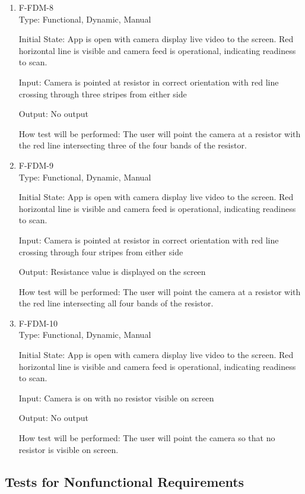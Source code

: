 \documentclass[12pt, titlepage]{article}
\begin{document}
\begin{enumerate}
\item{F-FDM-8\\}
Type: Functional, Dynamic, Manual
					
Initial State: 
App is open with camera display live video to the screen. Red horizontal line is visible and camera feed is operational, indicating readiness to scan.
					
Input: 
Camera is pointed at resistor in correct orientation with red line crossing through three stripes from either side
					
Output: 
No output	

How test will be performed: 
The user will point the camera at a resistor with the red line intersecting three of the four bands of the resistor.

\item{F-FDM-9\\}
Type: Functional, Dynamic, Manual
					
Initial State: 
App is open with camera display live video to the screen. Red horizontal line is visible and camera feed is operational, indicating readiness to scan.
					
Input: 
Camera is pointed at resistor in correct orientation with red line crossing through four stripes from either side
					
Output: 
Resistance value is displayed on the screen	

How test will be performed: 
The user will point the camera at a resistor with the red line intersecting all four bands of the resistor.

\item{F-FDM-10\\}
Type: Functional, Dynamic, Manual
					
Initial State: 
App is open with camera display live video to the screen. Red horizontal line is visible and camera feed is operational, indicating readiness to scan.
					
Input: 
Camera is on with no resistor visible on screen
					
Output: 
No output

How test will be performed: 
The user will point the camera so that no resistor is visible on screen.

\end{enumerate}








\subsection{Tests for Nonfunctional Requirements}
\end{document}
